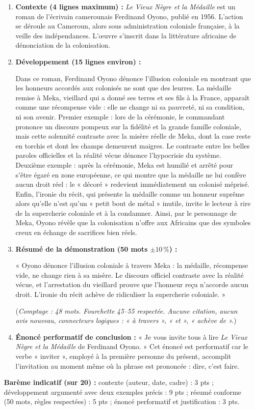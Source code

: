 \documentclass[11pt]{article}
\begin{document}
\begin{corrige}
\begin{enumerate}
\item \textbf{Contexte (4 lignes maximum) :} \emph{Le Vieux Nègre et la Médaille} est un roman de l'écrivain camerounais Ferdinand Oyono, publié en 1956. L'action se déroule au Cameroun, alors sous administration coloniale française, à la veille des indépendances. L'œuvre s'inscrit dans la littérature africaine de dénonciation de la colonisation.
\item \textbf{Développement (15 lignes environ) :}

Dans ce roman, Ferdinand Oyono dénonce l'illusion coloniale en montrant que les honneurs accordés aux colonisés ne sont que des leurres. La médaille remise à Meka, vieillard qui a donné ses terres et ses fils à la France, apparaît comme une récompense vide : elle ne change ni sa pauvreté, ni sa condition, ni son avenir. Premier exemple : lors de la cérémonie, le commandant prononce un discours pompeux sur la fidélité et la grande famille coloniale, mais cette solennité contraste avec la misère réelle de Meka, dont la case reste en torchis et dont les champs demeurent maigres. Le contraste entre les belles paroles officielles et la réalité vécue dénonce l'hypocrisie du système. Deuxième exemple : après la cérémonie, Meka est humilié et arrêté pour s'être égaré en zone européenne, ce qui montre que la médaille ne lui confère aucun droit réel : le « décoré » redevient immédiatement un colonisé méprisé. Enfin, l'ironie du récit, qui présente la médaille comme un honneur suprême alors qu'elle n'est qu'un « petit bout de métal » inutile, invite le lecteur à rire de la supercherie coloniale et à la condamner. Ainsi, par le personnage de Meka, Oyono révèle que la colonisation n'offre aux Africains que des symboles creux en échange de sacrifices bien réels.
\item \textbf{Résumé de la démonstration (50 mots $\pm 10\,\%$) :}

« Oyono dénonce l'illusion coloniale à travers Meka : la médaille, récompense vide, ne change rien à sa misère. Le discours officiel contraste avec la réalité vécue, et l'arrestation du vieillard prouve que l'honneur reçu n'accorde aucun droit. L'ironie du récit achève de ridiculiser la supercherie coloniale. »

(\emph{Comptage : 48 mots. Fourchette 45--55 respectée. Aucune citation, aucun avis nouveau, connecteurs logiques : « à travers », « et », « achève de ».})
\item \textbf{Énoncé performatif de conclusion :} « Je vous invite tous à lire \emph{Le Vieux Nègre et la Médaille} de Ferdinand Oyono. » Cet énoncé est performatif car le verbe « inviter », employé à la première personne du présent, accomplit l'invitation au moment même où la phrase est prononcée : dire, c'est faire.
\end{enumerate}
\textbf{Barème indicatif (sur 20) :} contexte (auteur, date, cadre) : 3 pts ; développement argumenté avec deux exemples précis : 9 pts ; résumé conforme (50 mots, règles respectées) : 5 pts ; énoncé performatif et justification : 3 pts.
\end{corrige}
\end{document}
